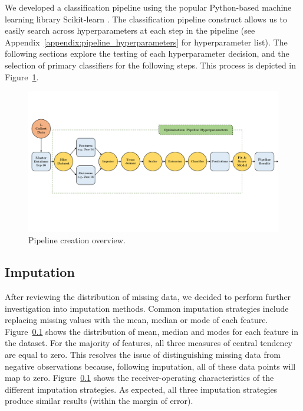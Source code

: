 \documentclass[../thesis/thesis.tex]{subfiles}
\begin{document}
We developed a classification pipeline using the popular Python-based machine learning library Scikit-learn \cite{pedregosa2011}. The classification pipeline construct allows us to easily search across hyperparameters at each step in the pipeline (see Appendix~\ref{appendix:pipeline_hyperparameters} for hyperparameter list). The following sections explore the testing of each hyperparameter decision, and the selection of primary classifiers for the following steps. This process is depicted in Figure~\ref{fig:design:pipeline_creation}.

\begin{figure}[!htb]
    \centering
    \includegraphics[width=\textwidth]{../figures/design/pipeline_creation}
    \caption{Pipeline creation overview.}
    \label{fig:design:pipeline_creation}
\end{figure}

\subsection{Imputation}

After reviewing the distribution of missing data, we decided to perform further investigation into imputation methods. Common imputation strategies include replacing missing values with the mean, median or mode of each feature. Figure~\ref{} shows the distribution of mean, median and modes for each feature in the dataset. For the majority of features, all three measures of central tendency are equal to zero. This resolves the issue of distinguishing missing data from negative observations because, following imputation, all of these data points will map to zero. Figure~\ref{} shows the receiver-operating characteristics of the different imputation strategies. As expected, all three imputation strategies produce similar results (within the margin of error).
\end{document}
